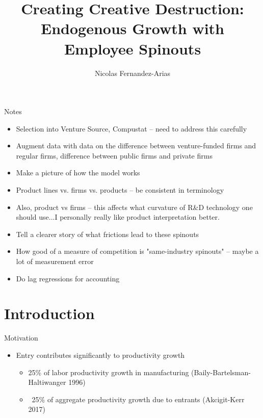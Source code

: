\documentclass[english,usenames,dvipsnames]{beamer}
\title{Creating Creative Destruction: Endogenous Growth with Employee Spinouts}
\author{Nicolas Fernandez-Arias}
\begin{document}
\maketitle

\begin{frame}{Notes}
\begin{itemize}
	\item Selection into Venture Source, Compustat -- need to address this carefully
	\item Augment data with data on the difference between venture-funded firms and regular firms, difference between public firms and private firms
	\item Make a picture of how the model works
	\item Product lines vs. firms vs. products -- be consistent in terminology
	\item Also, product vs firms -- this affects what curvature of R\&D technology one should use...I personally really like product interpretation better.
	\item Tell a clearer story of what frictions lead to these spinouts
	\item How good of a measure of competition is "same-industry spinouts" -- maybe a lot of measurement error
	\item Do lag regressions for accounting
\end{itemize}
\end{frame}



\section{Introduction}

\begin{frame}{Motivation}
\begin{itemize}
	\item Entry contributes significantly to productivity growth
	\begin{itemize}
		\item 25\% of labor productivity growth in manufacturing (Baily-Bartelsman-Haltiwanger 1996)
		\item ~25\% of aggregate productivity growth due to entrants (Akcigit-Kerr 2017)
	\end{itemize}
\end{itemize}
\end{frame}
\end{document}
